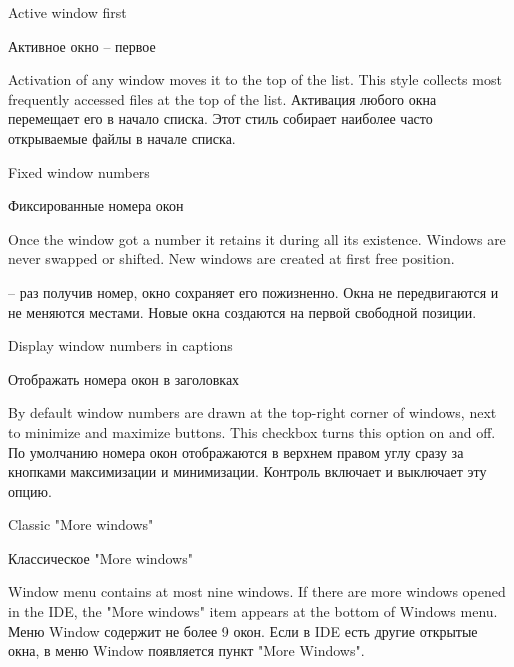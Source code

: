 \begin{popup}

\ifenglish
\caption{Active window first}
 \else
\caption{Активное окно -- первое}
\fi
{}

\ifenglish
Activation of any window moves it to the top of the list.
This style collects most frequently accessed files at the top of the list.
 \else
Активация любого окна перемещает его в начало списка.
Этот стиль собирает наиболее часто открываемые файлы в начале списка.
\fi
\end{popup}

\begin{popup}
\ifenglish
\caption{Fixed window numbers}
 \else
\caption{Фиксированные номера окон}
\fi
{}

\ifenglish
Once the window got a number it retains it during all its existence. Windows are
never swapped or shifted. New windows are created at first free position.

 \else
-- раз получив номер, окно сохраняет его пожизненно. Окна не передвигаются и не 
меняются местами. Новые окна создаются на первой свободной позиции. 
\fi

\end{popup}

\begin{popup}

\ifenglish
\caption{Display window numbers in captions}
 \else
\caption{Отображать номера окон в заголовках}
\fi
{}

\ifenglish
By default window numbers are drawn at the top-right corner of windows,
next to minimize and maximize buttons.
This checkbox turns this option on and off.
 \else
По умолчанию номера окон отображаются в верхнем правом углу сразу за 
кнопками максимизации и минимизации. Контроль включает и выключает эту опцию. 
\fi 
\end{popup}

\begin{popup}

\ifenglish
\caption{Classic "More windows"}
 \else
\caption{Классическое "More windows"}
\fi
{}

\ifenglish
Window menu contains at most nine windows.
If there are more windows opened in the IDE, the "More windows" item
appears at the bottom of Windows menu.
 \else
Меню Window содержит не более 9 окон.
Если в IDE есть другие открытые окна, в меню Window появляется пункт 
"More Windows".
\fi
\end{popup}

